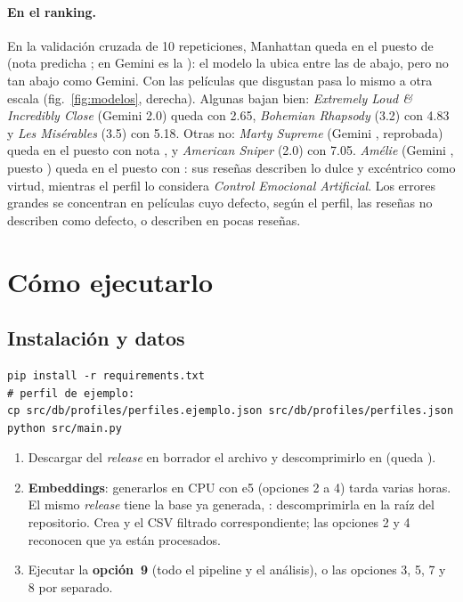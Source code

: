 \documentclass[11pt,a4paper]{article}
\newcommand{\menu}[1]{\textsf{\textbf{opción~#1}}}
\begin{document}
\paragraph{En el ranking.} En la validación cruzada de 10 repeticiones, Manhattan queda en el puesto
\PuestoManhattan{} de \NPeliculasCV{} (nota predicha \NotaCVManhattan; en Gemini es la \PuestoGeminiManhattan): el modelo
la ubica entre las de abajo, pero no tan abajo como Gemini. Con las películas que disgustan pasa lo mismo a otra escala
(fig.~\ref{fig:modelos}, derecha). Algunas bajan bien: \emph{Extremely Loud \& Incredibly Close} (Gemini 2.0) queda con
2.65, \emph{Bohemian Rhapsody} (3.2) con 4.83 y \emph{Les Misérables} (3.5) con 5.18. Otras no: \emph{Marty Supreme}
(Gemini \NotaGeminiMarty, reprobada) queda en el puesto \PuestoMarty{} con nota \NotaCVMarty, y \emph{American Sniper}
(2.0) con 7.05. \emph{Amélie} (Gemini \NotaGeminiAmelie, puesto \PuestoGeminiAmelie) queda en el puesto \PuestoAmelie{}
con \NotaCVAmelie: sus reseñas describen lo dulce y excéntrico como virtud, mientras el perfil lo considera
\emph{Control Emocional Artificial}. Los errores grandes se concentran en películas cuyo defecto, según el perfil, las
reseñas no describen como defecto, o describen en pocas reseñas.

\section{Cómo ejecutarlo}

\subsection{Instalación y datos}
\begin{Verbatim}[fontsize=\small,frame=single,framesep=2mm]
pip install -r requirements.txt
# perfil de ejemplo:
cp src/db/profiles/perfiles.ejemplo.json src/db/profiles/perfiles.json
python src/main.py
\end{Verbatim}

\begin{enumerate}
  \item Descargar del \emph{release} en borrador  el archivo  y
  descomprimirlo en  (queda ).
  \item \textbf{Embeddings}: generarlos en CPU con e5 (opciones 2 a 4) tarda varias horas. El mismo \emph{release} tiene
  la base ya generada, : descomprimirla en la raíz del
  repositorio. Crea  y el CSV filtrado correspondiente; las
  opciones 2 y 4 reconocen que ya están procesados.
  \item Ejecutar la \menu{9} (todo el pipeline y el análisis), o las opciones 3, 5, 7 y 8 por separado.
\end{enumerate}
\end{document}
